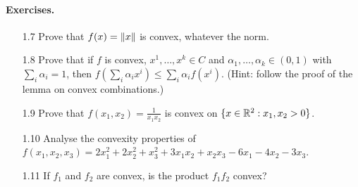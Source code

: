 \paragraph{Exercises.}
\begin{itemize}
    \item[1.7] Prove that $f(x) = \left\lVert x \right\rVert$ is convex, whatever the norm.
    \item[1.8] Prove that if $f$ is convex, $x^1, \dots, x^k \in C$ and $\alpha_1, \dots, \alpha_k \in (0,1)$ with $\sum_i \alpha_i = 1$, then $f(\sum_i \alpha_i x^i) \le \sum_i \alpha_i f(x^i)$. (Hint: follow the proof of the lemma on convex combinations.)
    \item[1.9] Prove that $f(x_1, x_2) = \frac{1}{x_1 x_2}$ is convex on $\{x \in \mathbb{R}^2 : x_1, x_2 > 0\}$.
    \item[1.10] Analyse the convexity properties of $f(x_1,x_2,x_3) = 2x_1^2 + 2x_2^2 + x_3^2 + 3x_1x_2 + x_2x_3 - 6x_1 - 4x_2 - 3x_3$.
    \item[1.11] If $f_1$ and $f_2$ are convex, is the product $f_1 f_2$ convex?
\end{itemize}
